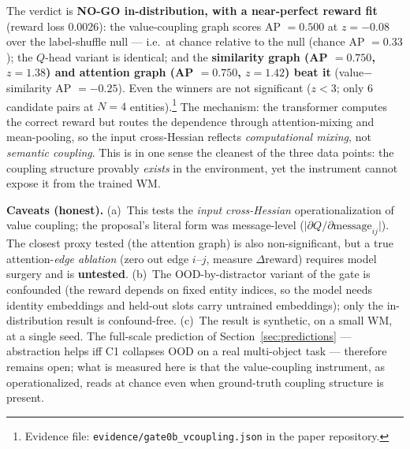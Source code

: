 \documentclass{article}
\begin{document}
The verdict is \textbf{NO-GO in-distribution, with a near-perfect reward fit} (reward loss $0.0026$): the value-coupling graph scores AP $=\mathbf{0.500}$ at $z=\mathbf{-0.08}$ over the label-shuffle null --- i.e.\ at chance relative to the null (chance AP $=0.33$); the $Q$-head variant is identical; and the \textbf{similarity graph (AP $=\mathbf{0.750}$, $z=1.38$) and attention graph (AP $=0.750$, $z=1.42$) beat it} (value$-$similarity AP $= -0.25$). Even the winners are not significant ($z<3$; only 6 candidate pairs at $N=4$ entities).\footnote{Evidence file: \texttt{evidence/gate0b\_vcoupling.json} in the paper repository.} The mechanism: the transformer computes the correct reward but routes the dependence through attention-mixing and mean-pooling, so the input cross-Hessian reflects \emph{computational mixing}, not \emph{semantic coupling}. This is in one sense the cleanest of the three data points: the coupling structure provably \emph{exists} in the environment, yet the instrument cannot expose it from the trained WM.

\textbf{Caveats (honest).} (a)~This tests the \emph{input cross-Hessian} operationalization of value coupling; the proposal's literal form was message-level ($\lvert \partial Q / \partial \text{message}_{ij} \rvert$). The closest proxy tested (the attention graph) is also non-significant, but a true attention-\emph{edge ablation} (zero out edge $i$--$j$, measure $\Delta$reward) requires model surgery and is \textbf{untested}. (b)~The OOD-by-distractor variant of the gate is confounded (the reward depends on fixed entity indices, so the model needs identity embeddings and held-out slots carry untrained embeddings); only the in-distribution result is confound-free. (c)~The result is synthetic, on a small WM, at a single seed. The full-scale prediction of Section~\ref{sec:predictions} --- abstraction helps iff C1 collapses OOD on a real multi-object task --- therefore remains open; what is measured here is that the value-coupling instrument, as operationalized, reads at chance even when ground-truth coupling structure is present.
\end{document}

